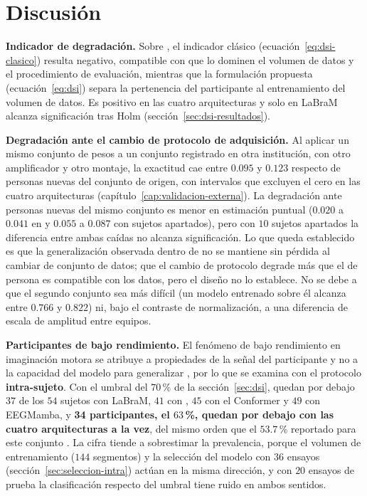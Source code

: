 \chapter{Discusión}

\textbf{Indicador de degradación.} Sobre \openbmi{}, el indicador clásico
(ecuación~\eqref{eq:dsi-clasico}) resulta negativo, compatible con que lo dominen el volumen de datos y el
procedimiento de evaluación, mientras que la formulación propuesta (ecuación~\eqref{eq:dsi}) separa la
pertenencia del participante al entrenamiento del volumen de datos. Es positivo en las cuatro arquitecturas y
solo en LaBraM alcanza significación tras Holm (sección~\ref{sec:dsi-resultados}).

\textbf{Degradación ante el cambio de protocolo de adquisición.} Al aplicar un mismo conjunto de pesos a un
conjunto registrado en otra institución, con otro amplificador y otro montaje, la exactitud cae entre $0.095$
y $0.123$ respecto de personas nuevas del conjunto de origen, con intervalos que excluyen el cero en las
cuatro arquitecturas (capítulo~\ref{cap:validacion-externa}). La degradación ante personas nuevas del mismo
conjunto es menor en estimación puntual ($0.020$ a $0.041$ en \loso{} y $0.055$ a $0.087$ con sujetos
apartados), pero con $10$ sujetos apartados la diferencia entre ambas caídas no alcanza significación. Lo que
queda establecido es que la generalización observada dentro de \openbmi{} no se mantiene sin pérdida al
cambiar de conjunto de datos; que el cambio de protocolo degrade más que el de persona es compatible con los
datos, pero el diseño no lo establece. No se debe a que el segundo conjunto sea más difícil (un modelo
entrenado sobre él alcanza entre $0.766$ y $0.822$) ni, bajo el contraste de normalización, a una diferencia
de escala de amplitud entre equipos.

\textbf{Participantes de bajo rendimiento.} El fenómeno de bajo rendimiento en imaginación motora se atribuye
a propiedades de la señal del participante y no a la capacidad del modelo para generalizar
\cite{vidaurre2010,blankertz2010}, por lo que se examina con el protocolo \textbf{intra-sujeto}. Con el umbral
del $70$\,\% de la sección~\ref{sec:dsi}, quedan por debajo $37$ de los $54$ sujetos con LaBraM, $41$ con
\eegnet{}, $45$ con el Conformer y $49$ con EEGMamba, y \textbf{34 participantes, el $63$\,\%, quedan por
debajo con las cuatro arquitecturas a la vez}, del mismo orden que el $53.7$\,\% reportado para este conjunto
\cite{lee2019}. La cifra tiende a sobrestimar la prevalencia, porque el volumen de entrenamiento ($144$
segmentos) y la selección del modelo con $36$ ensayos (sección~\ref{sec:seleccion-intra}) actúan en la misma
dirección, y con $20$ ensayos de prueba la clasificación respecto del umbral tiene ruido en ambos sentidos.

